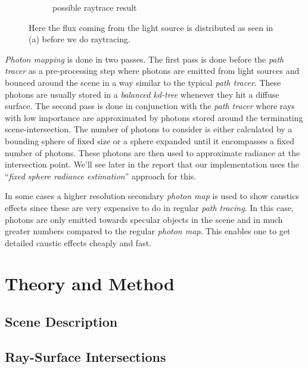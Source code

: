 \documentclass[a4paper, twocolumn]{article}
\begin{document}
\begin{figure}[ht]
\begin{subfigure}{0.498\linewidth}
            \caption{possible raytrace result}
        \end{subfigure}
        \caption{Here the flux coming from the light source is distributed as seen in (a) before we do raytracing.}
        \label{fig:photon_mapping}
    \end{figure}

    \vspace{-0.25em}

    \textit{Photon mapping} is done in two passes. The first pass is done before the \textit{path tracer} as a pre-processing step where photons are emitted from light sources and bounced around the scene in a way similar to the typical \textit{path tracer}. These photons are usually stored in a \emph{balanced kd-tree} whenever they hit a diffuse surface. The second pass is done in conjunction with the \textit{path tracer} where rays with low importance are approximated by photons stored around the terminating scene-intersection. The number of photons to consider is either calculated by a bounding sphere of fixed size or a sphere expanded until it encompasses a fixed number of photons. These photons are then used to approximate radiance at the intersection point. We'll see later in the report that our implementation uses the ``\emph{fixed sphere radiance estimation}'' approach for this.

In some cases a higher resolution secondary \textit{photon map} is used to show caustics effects since these are very expensive to do in regular \textit{path tracing}. In this case, photons are only emitted towards specular objects in the scene and in much greater numbers compared to the regular \textit{photon map}. This enables one to get detailed caustic effects cheaply and fast.

    \section{Theory and Method} \label{sec:theory_and_method}

        \clearpage

        \subsection{Scene Description} \label{sec:scene_description}

        \clearpage

        \subsection{Ray-Surface Intersections} \label{sec:ray-surface_intersections}
\end{document}
